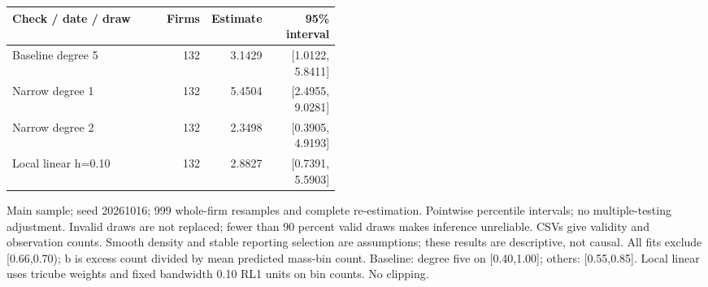 \begin{threeparttable}
\begin{tabular}{p{0.47\linewidth}rrr}
\toprule
Check / date / draw & Firms & Estimate & 95\% interval \\
\midrule
Baseline degree 5 & 132 & 3.1429 & [1.0122, 5.8411] \\
Narrow degree 1 & 132 & 5.4504 & [2.4955, 9.0281] \\
Narrow degree 2 & 132 & 2.3498 & [0.3905, 4.9193] \\
Local linear h=0.10 & 132 & 2.8827 & [0.7391, 5.5903] \\
\bottomrule
\end{tabular}
\begin{tablenotes}[flushleft]\footnotesize
\item[] Main sample; seed 20261016; 999 whole-firm resamples and complete re-estimation. Pointwise percentile intervals; no multiple-testing adjustment. Invalid draws are not replaced; fewer than 90 percent valid draws makes inference unreliable. CSVs give validity and observation counts. Smooth density and stable reporting selection are assumptions; these results are descriptive, not causal. All fits exclude [0.66,0.70); b is excess count divided by mean predicted mass-bin count. Baseline: degree five on [0.40,1.00]; others: [0.55,0.85]. Local linear uses tricube weights and fixed bandwidth 0.10 RL1 units on bin counts. No clipping.
\end{tablenotes}
\end{threeparttable}
\par\medskip
